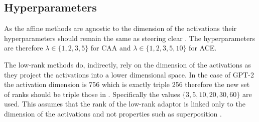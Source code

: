 \subsection{Hyperparameters}

As the affine methods are agnostic to the dimension of the activations their hyperparameters should remain the same as steering clear .
The hyperparameters are therefore $\lambda \in \{1, 2, 3, 5\}$ for CAA and $\lambda \in \{1, 2, 3, 5, 10\}$ for ACE.

The low-rank methods do, indirectly, rely on the dimension of the activations as they project the activations into a lower dimensional space.
In the case of GPT-2 \cite{gpt-2} the activation dimension is 756 which is exactly triple 256 therefore the new set of ranks should be triple those in \citet{steering-clear}.
Specifically the values $\{3, 5, 10, 20, 30, 60\}$ are used.
This assumes that the rank of the low-rank adaptor is linked only to the dimension of the activations and not properties such as superposition .
